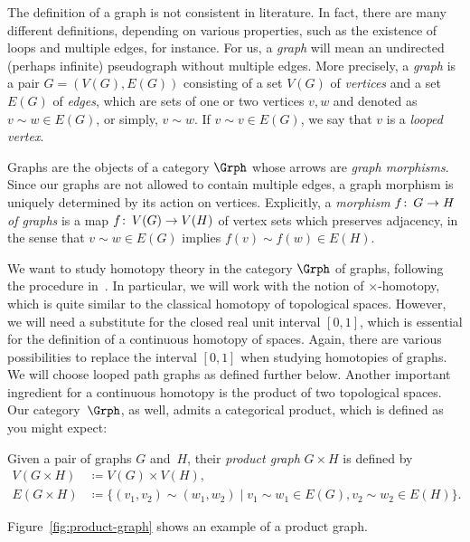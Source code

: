 \documentclass[11pt,a4paper]{article}
\begin{document}
	The definition of a graph is not consistent in literature. In fact, there are many different definitions, depending on various properties, such as the existence of loops and multiple edges, for instance. For us, a \textit{graph} will mean an undirected (perhaps infinite) pseudograph without multiple edges. More precisely, a \textit{graph} is a pair $G=(V(G),E(G))$ consisting of a set $V(G)$ of \textit{vertices} and a set $E(G)$ of \textit{edges}, which are sets of one or two vertices $v,w$ and denoted as $v\sim w\in E(G)$, or simply, $v\sim w$. If $v\sim v\in E(G)$, we say that $v$ is a \textit{looped vertex}. 
	
	Graphs are the objects of a category $\Grph$ whose arrows are \textit{graph morphisms}. Since our graphs are not allowed to contain multiple edges, a graph morphism is uniquely determined by its action on vertices. Explicitly, a \textit{morphism} $f\colon\thinspace G\to H$ \textit{of graphs} is a map $f\colon\thinspace V(G)\to V(H)$ of vertex sets which preserves adjacency, in the sense that $v\sim w\in E(G)$ implies $f(v)\sim f(w)\in E(H)$.
	
	\bigskip
	We want to study homotopy theory in the category $\Grph$ of graphs, following the procedure in~\cite{Chih-Scull}. In particular, we will work with the notion of $\times$-homotopy, which is quite similar to the classical homotopy of topological spaces. However, we will need a substitute for the closed real unit interval $[0,1]$, which is essential for the definition of a continuous homotopy of spaces. Again, there are various possibilities to replace the interval $[0,1]$ when studying homotopies of graphs. We will choose looped path graphs as defined further below.
	Another important ingredient for a continuous homotopy is the product of two topological spaces. Our category~$\Grph$, as well, admits a categorical product, which is defined as you might expect:
	
	\begin{defi}
		Given a pair of graphs $G$ and~$H$, their \textit{product graph} $G\times H$ is defined by 
		\begin{align*}
			V(G\times H) &\coloneqq V(G)\times V(H), \\
			E(G\times H) &\coloneqq \{ (v_1,v_2)\sim (w_1,w_2)\mathbin| v_1\sim w_1\in E(G), v_2\sim w_2\in E(H) \}.			
		\end{align*}
	\end{defi}

	\noindent Figure~\ref{fig:product-graph} shows an example of a product graph.
	
\end{document}
